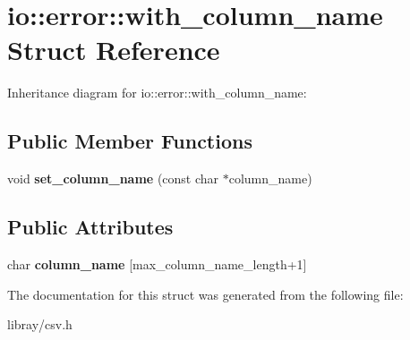 \hypertarget{structio_1_1error_1_1with__column__name}{}\section{io\+:\+:error\+:\+:with\+\_\+column\+\_\+name Struct Reference}
\label{structio_1_1error_1_1with__column__name}


Inheritance diagram for io\+:\+:error\+:\+:with\+\_\+column\+\_\+name\+:
\subsection*{Public Member Functions}
\begin{DoxyCompactItemize}
\item 
\mbox{\label{structio_1_1error_1_1with__column__name_a2a8144d3591a4bb618368ca7261befef}} 
void {\bfseries set\+\_\+column\+\_\+name} (const char $\ast$column\+\_\+name)
\end{DoxyCompactItemize}
\subsection*{Public Attributes}
\begin{DoxyCompactItemize}
\item 
\mbox{\label{structio_1_1error_1_1with__column__name_af40ba00f1f035d363b099baf1f724323}} 
char {\bfseries column\+\_\+name} \mbox{[}max\+\_\+column\+\_\+name\+\_\+length+1\mbox{]}
\end{DoxyCompactItemize}


The documentation for this struct was generated from the following file\+:\begin{DoxyCompactItemize}
\item 
libray/csv.\+h\end{DoxyCompactItemize}

